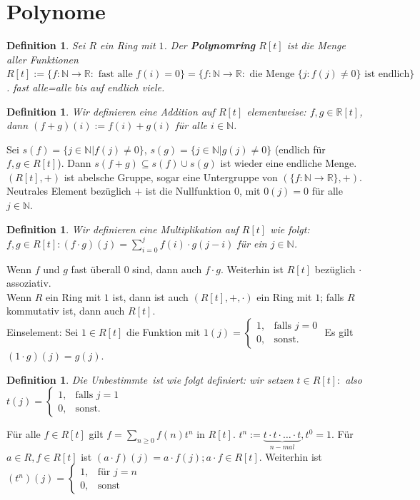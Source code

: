 \documentclass[12pt,a4paper]{article}
\theoremstyle{plain}
\newtheorem{Definition}[Theorem]{Definition}
\newcommand{\N}{\mathbb{N}}
\newcommand{\R}{\mathbb{R}}
\numberwithin{equation}{section}
\begin{document}
\section{Polynome}
\begin{Definition}
Sei $R$ ein Ring mit $1$. Der \textbf{Polynomring} $R[t]$ ist die Menge aller Funktionen $R[t]:=\{f:\N\rightarrow\R:\text{ fast alle }f(i)=0\}=\{f:\N\rightarrow\R:\text{ die Menge }\{j:f(j)\neq 0\}\text{ ist endlich}\}$. \glqq fast alle\grqq=\glqq alle bis auf endlich viele\grqq. 
\end{Definition}
\begin{Definition}
Wir definieren eine Addition auf $R[t]$ elementweise: $f,g\in\R[t]$, dann $(f+g)(i):=f(i)+g(i)$ für alle $i\in\N$. 
\end{Definition}
Sei $s(f)=\{j\in\N|f(j)\neq 0\}$, $s(g)=\{j\in\N|g(j)\neq 0\}$ (endlich für $f,g\in R[t]$). Dann $s(f+g)\subseteq s(f)\cup s(g)$ ist wieder eine endliche Menge. \\
$(R[t],+)$ ist abelsche Gruppe, sogar eine Untergruppe von $(\{f:\N\rightarrow\R\},+)$. Neutrales Element bezüglich $+$ ist die Nullfunktion $0$, mit $0(j)=0$ für alle $j\in\N$.
\begin{Definition}
Wir definieren eine Multiplikation auf $R[t]$ wie folgt: $f,g\in R[t]: (f\cdot g)(j)=\sum_{i=0}^j{f(i)\cdot g(j-i)}$ für ein $j\in\N$. 
\end{Definition} Wenn $f$ und $g$ fast überall $0$ sind, dann auch $f\cdot g$. Weiterhin ist $R[t]$ bezüglich $\cdot$ assoziativ.\\
Wenn $R$ ein Ring mit $1$ ist, dann ist auch $(R[t],+,\cdot)$ ein Ring mit $1$; falls $R$ kommutativ ist, dann auch $R[t]$.\\
Einselement: Sei $1\in R[t]$ die Funktion mit $1(j)=\left\lbrace\begin{array}{ll}1,&\text{falls }j=0\\
0,&\text{sonst.}
\end{array}\right.$ Es gilt $(1\cdot g)(j)=g(j)$.\\
\begin{Definition}
Die \glqq Unbestimmte\grqq\ ist wie folgt definiert: wir setzen $t\in R[t]:$ also $t(j)=\left\lbrace\begin{array}{ll}1,&\text{falls }j=1\\
0,&\text{sonst.}
\end{array}\right.$ 
\end{Definition}
Für alle $f\in R[t]$ gilt $f=\sum_{n\geq 0}{f(n)t^n}$ in $R[t]$. $t^n:=\underbrace{t\cdot t\cdot\ldots\cdot t}_{n-mal},t^0=1$. Für $a\in R, f\in R[t]$ ist $(a\cdot f)(j)=a\cdot f(j); a\cdot f\in R[t]$. Weiterhin ist $(t^n)(j)=\left\lbrace\begin{array}{ll}1,&\text{für }j=n\\0,&\text{sonst}\end{array}\right.$\\
\end{document}
